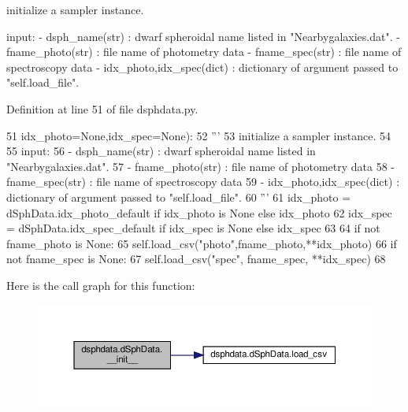 \begin{DoxyVerb}initialize a sampler instance.

input:
    - dsph_name(str)   : dwarf spheroidal name listed in "Nearbygalaxies.dat".
    - fname_photo(str) : file name of photometry data
    - fname_spec(str)  : file name of spectroscopy data
    - idx_photo,idx_spec(dict) : dictionary of argument passed to "self.load_file".
\end{DoxyVerb}
 

Definition at line 51 of file dsphdata.\+py.


\begin{DoxyCode}
51                  idx\_photo=\textcolor{keywordtype}{None},idx\_spec=\textcolor{keywordtype}{None}):
52         \textcolor{stringliteral}{'''}
53 \textcolor{stringliteral}{        initialize a sampler instance.}
54 \textcolor{stringliteral}{        }
55 \textcolor{stringliteral}{        input:}
56 \textcolor{stringliteral}{            - dsph\_name(str)   : dwarf spheroidal name listed in "Nearbygalaxies.dat".}
57 \textcolor{stringliteral}{            - fname\_photo(str) : file name of photometry data}
58 \textcolor{stringliteral}{            - fname\_spec(str)  : file name of spectroscopy data}
59 \textcolor{stringliteral}{            - idx\_photo,idx\_spec(dict) : dictionary of argument passed to "self.load\_file".}
60 \textcolor{stringliteral}{        '''}
61         idx\_photo = dSphData.idx\_photo\_default \textcolor{keywordflow}{if} idx\_photo \textcolor{keywordflow}{is} \textcolor{keywordtype}{None} \textcolor{keywordflow}{else} idx\_photo
62         idx\_spec = dSphData.idx\_spec\_default \textcolor{keywordflow}{if} idx\_spec \textcolor{keywordflow}{is} \textcolor{keywordtype}{None} \textcolor{keywordflow}{else} idx\_spec
63 
64         \textcolor{keywordflow}{if} \textcolor{keywordflow}{not} fname\_photo \textcolor{keywordflow}{is} \textcolor{keywordtype}{None}:
65             self.load\_csv(\textcolor{stringliteral}{"photo"},fname\_photo,**idx\_photo)
66         \textcolor{keywordflow}{if} \textcolor{keywordflow}{not}  fname\_spec \textcolor{keywordflow}{is} \textcolor{keywordtype}{None}:
67             self.load\_csv(\textcolor{stringliteral}{"spec"}, fname\_spec, **idx\_spec)
68         
\end{DoxyCode}
Here is the call graph for this function\+:\nopagebreak
\begin{figure}[H]
\begin{center}
\leavevmode
\includegraphics[width=350pt]{d1/dbc/classdsphdata_1_1dSphData_afcd54ca5255be74de80578f5962daba8_cgraph}
\end{center}
\end{figure}


